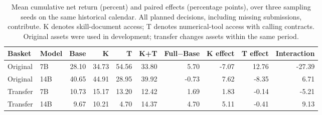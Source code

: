 \begin{table}[t]
\centering\small
\setlength{\tabcolsep}{4pt}
\begin{tabular}{llrrrrrrrr}
\toprule
Basket & Model & Base & K & T & K+T & Full$-$Base & K effect & T effect & Interaction \\
\midrule
Original & 7B & 28.10 & 34.73 & 54.56 & 33.80 & 5.70 & -7.07 & 12.76 & -27.39 \\
Original & 14B & 40.65 & 44.91 & 28.95 & 39.92 & -0.73 & 7.62 & -8.35 & 6.71 \\
Transfer & 7B & 10.73 & 15.17 & 13.20 & 12.42 & 1.69 & 1.83 & -0.14 & -5.21 \\
Transfer & 14B & 9.67 & 10.21 & 4.70 & 14.37 & 4.70 & 5.11 & -0.41 & 9.13 \\
\bottomrule
\end{tabular}
\caption{Mean cumulative net return (percent) and paired effects (percentage points), over three sampling seeds on the same historical calendar. All planned decisions, including missing submissions, contribute. K denotes skill-document access; T denotes numerical-tool access with calling contracts. Original assets were used in development; transfer changes assets within the same period.}
\label{tab:factorial-main}
\end{table}
